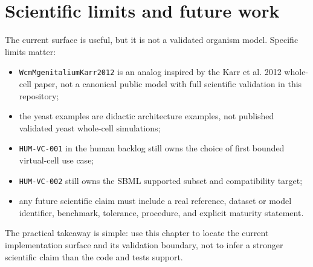 \section{Scientific limits and future work}

The current surface is useful, but it is not a validated organism model.
Specific limits matter:
\begin{itemize}
\item \texttt{WcmMgenitaliumKarr2012} is an analog inspired by the Karr et al.
      2012 whole-cell paper, not a canonical public model with full scientific
      validation in this repository;
\item the yeast examples are didactic architecture examples, not published
      validated yeast whole-cell simulations;
\item \texttt{HUM-VC-001} in the human backlog still owns the choice of first
      bounded virtual-cell use case;
\item \texttt{HUM-VC-002} still owns the SBML supported subset and compatibility
      target;
\item any future scientific claim must include a real reference, dataset or
      model identifier, benchmark, tolerance, procedure, and explicit maturity
      statement.
\end{itemize}

The practical takeaway is simple: use this chapter to locate the current
implementation surface and its validation boundary, not to infer a stronger
scientific claim than the code and tests support.
